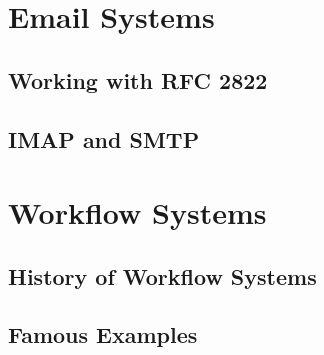 \section{Email Systems}


\subsection{Working with RFC 2822}


\subsection{IMAP and SMTP}



\section{Workflow Systems}


\subsection{History of Workflow Systems}


\subsection{Famous Examples}